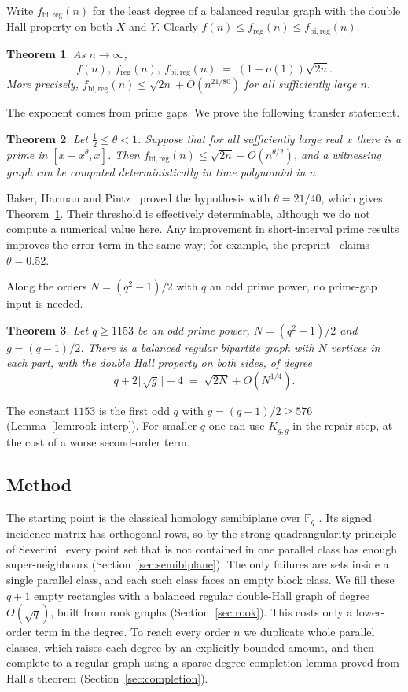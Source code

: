 \documentclass[11pt]{amsart}
\newtheorem{theorem}{Theorem}
\theoremstyle{definition}
\theoremstyle{remark}
\newcommand{\F}{\mathbb{F}}
\newcommand{\freg}{f_{\mathrm{reg}}}
\newcommand{\fbi}{f_{\mathrm{bi,reg}}}
\begin{document}
Write $\fbi(n)$ for the least degree of a balanced regular graph with the double Hall
property on both $X$ and $Y$. Clearly $f(n)\le\freg(n)\le\fbi(n)$.

\begin{theorem}\label{thm:main}
As $n\to\infty$,
\[
  f(n),\ \freg(n),\ \fbi(n) \;=\; (1+o(1))\sqrt{2n}.
\]
More precisely, $\fbi(n)\le\sqrt{2n}+O(n^{21/80})$ for all sufficiently large $n$.
\end{theorem}

The exponent comes from prime gaps. We prove the following transfer statement.

\begin{theorem}\label{thm:transfer}
Let $\tfrac12\le\theta<1$. Suppose that for all sufficiently large real $x$ there is a prime
in $[x-x^\theta,x]$. Then $\fbi(n)\le\sqrt{2n}+O(n^{\theta/2})$, and a witnessing graph
can be computed deterministically in time polynomial in $n$.
\end{theorem}

Baker, Harman and Pintz~\cite{BHP} proved the hypothesis with $\theta=21/40$, which gives
Theorem~\ref{thm:main}. Their threshold is effectively determinable, although
we do not compute a numerical value here. Any improvement in short-interval prime results improves the error
term in the same way; for example, the preprint~\cite{Li} claims $\theta=0.52$.

Along the orders $N=(q^2-1)/2$ with $q$ an odd prime power, no prime-gap input is needed.

\begin{theorem}\label{thm:semibiplane}
Let $q\ge 1153$ be an odd prime power, $N=(q^2-1)/2$ and $g=(q-1)/2$. There is a balanced
regular bipartite graph with $N$ vertices in each part, with the double Hall property on both
sides, of degree
\[
  q+2\lfloor\sqrt g\rfloor+4 \;=\; \sqrt{2N}+O(N^{1/4}).
\]
\end{theorem}

The constant $1153$ is the first odd $q$ with $g=(q-1)/2\ge 576$ (Lemma~\ref{lem:rook-interp}).
For smaller $q$ one can use $K_{g,g}$ in the repair step, at the cost of a worse
second-order term.

\subsection*{Method}
The starting point is the classical homology semibiplane over $\F_q$ \cite{Moorhouse}. Its
signed incidence matrix has orthogonal rows, so by the strong-quadrangularity principle
of Severini~\cite{Severini,SeveriniSzollosi} every point set that is not contained in one
parallel class has enough super-neighbours (Section~\ref{sec:semibiplane}). The only
failures are sets inside a single parallel class, and each such class faces an empty block
class. We fill these $q+1$ empty rectangles with a balanced regular double-Hall graph of
degree $O(\sqrt q)$, built from rook graphs (Section~\ref{sec:rook}). This costs only a
lower-order term in the degree. To reach every order $n$ we duplicate whole parallel
classes, which raises each degree by an explicitly bounded amount, and then complete to a
regular graph using a sparse degree-completion lemma proved from Hall's theorem
(Section~\ref{sec:completion}).
\end{document}
